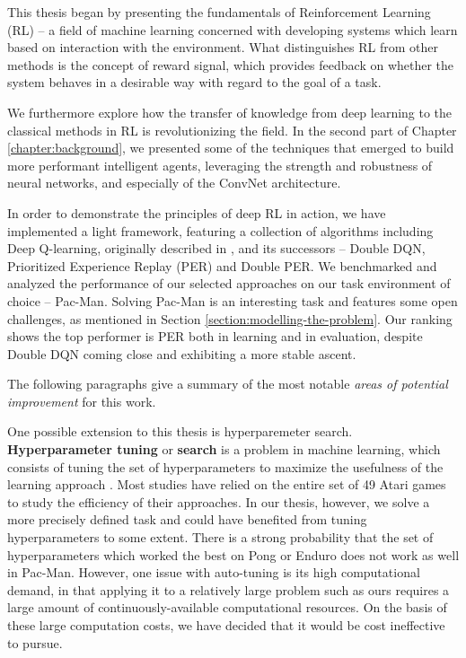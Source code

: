 This thesis began by presenting the fundamentals of Reinforcement Learning (RL) -- a field of machine learning concerned with developing systems which learn based on interaction with the environment.
What distinguishes RL from other methods is the concept of reward signal, which provides feedback on whether the system behaves in a desirable way with regard to the goal of a task.

We furthermore explore how the transfer of knowledge from deep learning to the classical methods in RL is revolutionizing the field.
In the second part of Chapter \ref{chapter:background}, we presented some of the techniques that emerged to build more performant intelligent agents, leveraging the strength and robustness of neural networks, and especially of the ConvNet architecture.

In order to demonstrate the principles of deep RL in action, we have implemented a light framework, featuring a collection of algorithms including Deep Q-learning, originally described in \cite{atari-dqn}, and its successors -- Double DQN, Prioritized Experience Replay (PER) and Double PER.
We benchmarked and analyzed the performance of our selected approaches on our task environment of choice -- Pac-Man. Solving Pac-Man is an interesting task and features some open challenges, as mentioned in Section \ref{section:modelling-the-problem}.
Our ranking shows the top performer is PER both in learning and in evaluation, despite Double DQN coming close and exhibiting a more stable ascent.

The following paragraphs give a summary of the most notable \emph{areas of potential improvement} for this work.

One possible extension to this thesis is hyperparemeter search.
\textbf{Hyperparameter tuning} or \textbf{search} is a problem in machine learning, which consists of tuning the set of hyperparameters to maximize the usefulness of the learning approach \cite{hyperparam-search-paper}.
Most studies have relied on the entire set of 49 Atari games to study the efficiency of their approaches.
In our thesis, however, we solve a more precisely defined task and could have benefited from tuning hyperparameters to some extent.
There is a strong probability that the set of hyperparameters which worked the best on Pong or Enduro does not work as well in Pac-Man.
However, one issue with auto-tuning is its high computational demand, in that applying it to a relatively large problem such as ours requires a large amount of continuously-available computational resources.
On the basis of these large computation costs, we have decided that it would be cost ineffective to pursue.

